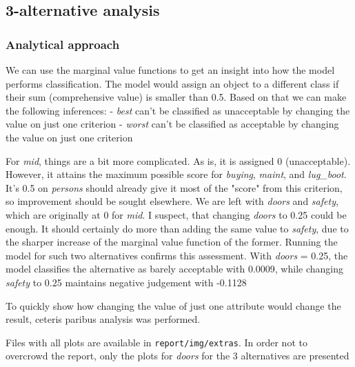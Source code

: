 \documentclass[../main.tex]{subfiles}
\begin{document}
\subsection{3-alternative analysis}

\subsubsection{Analytical approach}
We can use the marginal value functions to get an insight into how the model
performs classification. The model would assign an object to a different class if
their sum (comprehensive value) is smaller than 0.5. Based on that we can make the
following inferences:
- \emph{best} can't be classified as unacceptable by changing the value on just one criterion
- \emph{worst} can't be classified as acceptable by changing the value on just one criterion

For \emph{mid}, things are a bit more complicated. As is, it is assigned 0 (unacceptable).
However, it attains the maximum possible score for \emph{buying}, \emph{maint}, and \emph{lug\_boot}.
It's 0.5 on \emph{persons} should already give it most of the "score" from this criterion, so improvement
should be sought elsewhere. We are left with \emph{doors} and \emph{safety}, which are originally at 0 for \emph{mid}.
I suspect, that changing \emph{doors} to 0.25 could be enough.
It should certainly do more than adding the same value to \emph{safety}, due to the sharper increase of the
marginal value function of the former. Running the model for such two alternatives confirms this assessment.
With \emph{doors} = 0.25, the model classifies the alternative as barely acceptable with 0.0009,
while changing \emph{safety} to 0.25 maintains negative judgement with -0.1128

To quickly show how changing the value of just one attribute would change the result, ceteris paribus analysis
was performed.

Files with all plots are available in \verb`report/img/extras`. In order not to overcrowd the report,
only the plots for \emph{doors} for the 3 alternatives are presented
\end{document}
